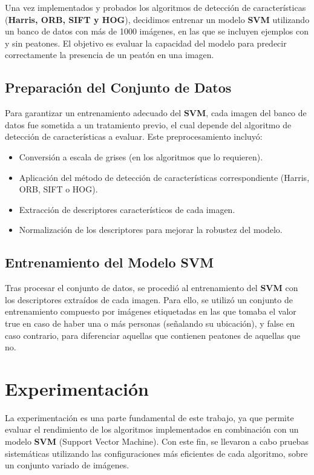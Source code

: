 \documentclass[a4paper]{article}
\begin{document}
Una vez implementados y probados los algoritmos de detección de características (\textbf{Harris, ORB, SIFT y HOG}), decidimos entrenar un modelo \textbf{SVM} utilizando un banco de datos con más de 1000 imágenes, en las que se incluyen ejemplos con y sin peatones. El objetivo es evaluar la capacidad del modelo para predecir correctamente la presencia de un peatón en una imagen.

\subsection{Preparación del Conjunto de Datos}

Para garantizar un entrenamiento adecuado del \textbf{SVM}, cada imagen del banco de datos fue sometida a un tratamiento previo, el cual depende del algoritmo de detección de características a evaluar. Este preprocesamiento incluyó:
\begin{itemize}
    \item Conversión a escala de grises (en los algoritmos que lo requieren).
    \item Aplicación del método de detección de características correspondiente (Harris, ORB, SIFT o HOG).
    \item Extracción de descriptores característicos de cada imagen.
    \item Normalización de los descriptores para mejorar la robustez del modelo.
\end{itemize}

\subsection{Entrenamiento del Modelo SVM}

Tras procesar el conjunto de datos, se procedió al entrenamiento del \textbf{SVM} con los descriptores extraídos de cada imagen. Para ello, se utilizó un conjunto de entrenamiento compuesto por imágenes etiquetadas en las que tomaba 
el valor true en caso de haber una o más personas (señalando su ubicación), y false en caso contrario, para diferenciar aquellas que contienen peatones de aquellas que no.


\section{Experimentación}

La experimentación es una parte fundamental de este trabajo, ya que permite evaluar el rendimiento de los algoritmos implementados en combinación con un modelo \textbf{SVM} (Support Vector Machine). 
Con este fin, se llevaron a cabo pruebas sistemáticas utilizando las configuraciones más eficientes de cada algoritmo, sobre un conjunto variado de imágenes.
\end{document}
